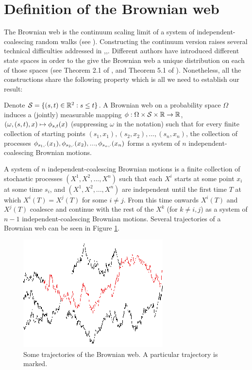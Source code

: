 {
\section{Definition of the Brownian web}
\label{sec:brownian-web-definition}

The Brownian web is the continuum scaling limit of a system of
independent-coalescing random walks (see
\cite{tsirelson-lecture-course}).  Constructing the
continuum version raises several technical difficulties addressed in
\cite{fontes-et-al},\cite{norris-turner},\cite{toth-werner}.
Different authors have introduced different state spaces in order to
the give the Brownian web a unique distribution on each of those
spaces (see Theorem 2.1 of \cite{fontes-et-al}, and Theorem 5.1 of
\cite{norris-turner}).
Nonetheless, all the
constructions share the following property which is all we need to
establish our result:

\newcommand{\simplex}{\mathcal{S}}

  Denote $\simplex=\{(s, t) \in \R^2 : s \le t\}$.
  A Brownian web on a probability space $\Omega$ induces a (jointly)
  measurable mapping $\webnoargs : \Omega \cross \simplex \cross \R
  \to \R$, $(\omega, (s, t), x) \mapsto \phi_{{s},{t}}(x)$ (suppressing
  $\omega$ in the notation) such that for every finite collection of
  starting points $(s_1, x_1),(s_2, x_2),...,(s_n, x_n)$, the
  collection of processes $\phi_{{s_1},{\cdot}}(x_1),
  \phi_{{s_2},{\cdot}}(x_2),...,\phi_{{s_n},{\cdot}}(x_n)$
  forms a system of $n$ independent-coalescing Brownian motions.

  \newcommand{\bm}[1]{X^{#1}}

  A system of $n$ independent-coalescing Brownian motions is a finite
  collection of stochastic processes $(\bm{1}, \bm{2},...,\bm{n})$ such that
  each $\bm{i}$ starts at some point $x_i$ at some time $s_i$, and $(\bm{1},
  \bm{2},...,\bm{n})$ are independent until the first time $T$ at which
  $\bm{i}(T)=\bm{j}(T)$ for some $i\neq j$. From this time onwards $\bm{i}(T)$
  and $\bm{j}(T)$ coalesce and continue with the rest of the $\bm{k}$ (for
  $k\neq i,j$) as a system of $n-1$ independent-coalescing Brownian motions.
  Several trajectories of a Brownian web can be seen in Figure
  \ref{fig:bw-trajectories}.

\begin{figure}
   \centering
   \includegraphics[scale=2]{sometraj.eps}
   \caption{Some trajectories of the Brownian web. A particular trajectory is marked.}
  \label{fig:bw-trajectories}
\end{figure}
}
